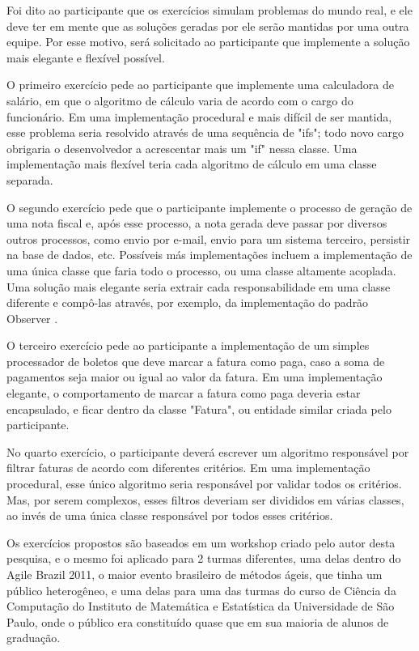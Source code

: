 Foi dito ao participante que os exercícios simulam problemas do mundo real, e ele deve
ter em mente que as soluções geradas por ele serão mantidas por uma outra equipe.
Por esse motivo, será solicitado ao participante que implemente a solução mais elegante e flexível 
possível.

O primeiro exercício pede ao participante que implemente uma calculadora de salário, em que
o algoritmo de cálculo varia de acordo com o cargo do funcionário. Em uma implementação
procedural e mais difícil de ser mantida, esse problema seria resolvido através de uma
sequência de "ifs"; todo novo cargo obrigaria o desenvolvedor a acrescentar mais um "if" 
nessa classe. Uma implementação mais flexível teria cada algoritmo de cálculo em uma 
classe separada.

O segundo exercício pede que o participante implemente o processo de geração de uma nota fiscal e, após
esse processo, a nota gerada deve passar por diversos outros processos, como envio por e-mail, envio
para um sistema terceiro, persistir na base de dados, etc. Possíveis más implementações incluem a 
implementação de uma única classe que faria todo o processo, ou uma classe altamente acoplada.
Uma solução mais elegante seria extrair cada responsabilidade em uma classe diferente e compô-las
através, por exemplo, da implementação do padrão Observer \cite{gof}.

O terceiro exercício pede ao participante a implementação de um simples processador de boletos que
deve marcar a fatura como paga, caso a soma de pagamentos seja maior ou igual ao valor da fatura. 
Em uma implementação elegante, o comportamento de marcar a fatura como paga deveria estar encapsulado, e 
ficar dentro da classe "Fatura", ou entidade similar criada pelo participante.

No quarto exercício, o participante deverá escrever um algoritmo responsável por filtrar faturas de
acordo com diferentes critérios. Em uma implementação procedural, esse único algoritmo seria
responsável por validar todos os critérios. Mas, por serem complexos, esses filtros deveriam ser divididos em 
várias classes, ao invés de uma única classe responsável por todos esses critérios.

Os exercícios propostos são baseados em um workshop criado pelo autor desta pesquisa, e o mesmo
foi aplicado para 2 turmas diferentes, uma delas dentro do Agile Brazil 2011, o
maior evento brasileiro de métodos ágeis, que tinha um público heterogêneo, e uma delas para
uma das turmas do curso de Ciência da Computação do Instituto de Matemática e Estatística da Universidade
de São Paulo, onde o público era constituído quase que em sua maioria de alunos de graduação. 

